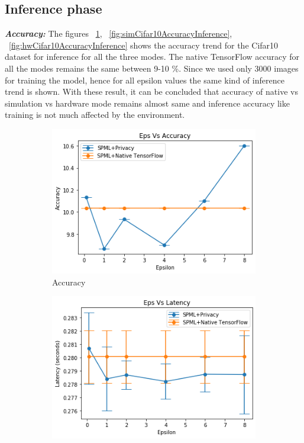 \subsection{Inference phase}
\textbf{\textit{Accuracy: }} The figures ~\ref{fig:nativeCifar10AccuracyInference}, ~\ref{fig:simCifar10AccuracyInference}, ~\ref{fig:hwCifar10AccuracyInference} shows the accuracy trend for the Cifar10 dataset for inference for all the three modes. The native TensorFlow accuracy for all the modes remains the same between 9-10 \%. Since we used only 3000 images for training the model, hence for all epsilon values the same kind of inference trend is shown. With these result, it can be concluded that accuracy of native vs simulation vs hardware mode remains almost same and inference accuracy like training is not much affected by the environment.
\begin{figure}
     \begin{subfigure}{0.5\textwidth}
         \includegraphics[width=\textwidth]{images/Inference/Cifar10NativeAccuracyInference.png}
         \caption{Accuracy}
         \label{fig:nativeCifar10AccuracyInference}
     \end{subfigure}
     \begin{subfigure}{0.5\textwidth}
         \includegraphics[width=\textwidth]{images/Inference/Cifar10NativeLatencyInference.png}

\end{subfigure}
\end{figure}
